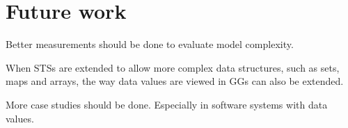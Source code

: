 \section{Future work}
Better measurements should be done to evaluate model complexity.

When STSs are extended to allow more complex data structures, such as sets, maps and arrays, the way data values are viewed in GGs can also be extended.

More case studies should be done. Especially in software systems with data values.
